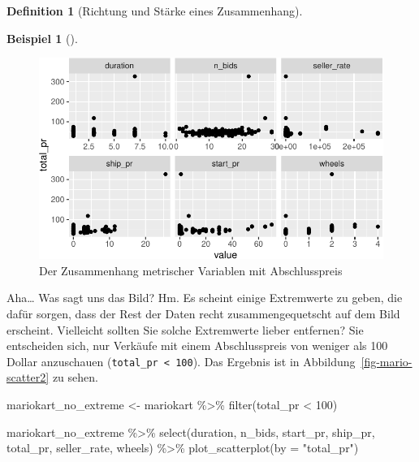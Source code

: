 \documentclass[
  a4paper,
  DIV=11]{scrreprt}
\newenvironment{Shaded}{\begin{snugshade}}{\end{snugshade}}
\newcommand{\AttributeTok}[1]{\textcolor[rgb]{0.40,0.45,0.13}{#1}}
\newcommand{\DecValTok}[1]{\textcolor[rgb]{0.68,0.00,0.00}{#1}}
\newcommand{\FunctionTok}[1]{\textcolor[rgb]{0.28,0.35,0.67}{#1}}
\newcommand{\NormalTok}[1]{\textcolor[rgb]{0.00,0.23,0.31}{#1}}
\newcommand{\OtherTok}[1]{\textcolor[rgb]{0.00,0.23,0.31}{#1}}
\newcommand{\SpecialCharTok}[1]{\textcolor[rgb]{0.37,0.37,0.37}{#1}}
\newcommand{\StringTok}[1]{\textcolor[rgb]{0.13,0.47,0.30}{#1}}
\theoremstyle{definition}
\theoremstyle{definition}
\newtheorem{example}{Beispiel}[chapter]
\theoremstyle{definition}
\newtheorem{definition}{Definition}[chapter]
\theoremstyle{remark}
\begin{document}
\begin{definition}[Richtung und Stärke eines
Zusammenhang]
\begin{example}[]
\begin{figure}[H]
{\includegraphics{040-verbildlichen_files/figure-pdf/fig-mario-scatter-1.pdf}

}

\caption{\label{fig-mario-scatter}Der Zusammenhang metrischer Variablen
mit Abschlusspreis}

\end{figure}%

Aha\ldots{} Was sagt uns das Bild? Hm. Es scheint einige Extremwerte zu
geben, die dafür sorgen, dass der Rest der Daten recht
zusammengequetscht auf dem Bild erscheint. Vielleicht sollten Sie solche
Extremwerte lieber entfernen? Sie entscheiden sich, nur Verkäufe mit
einem Abschlusspreis von weniger als 100 Dollar anzuschauen
(\texttt{total\_pr\ \textless{}\ 100}). Das Ergebnis ist in
Abbildung~\ref{fig-mario-scatter2} zu sehen.

\begin{Shaded}
\begin{Highlighting}[]
\NormalTok{mariokart\_no\_extreme }\OtherTok{\textless{}{-}}
\NormalTok{  mariokart }\SpecialCharTok{\%\textgreater{}\%} 
  \FunctionTok{filter}\NormalTok{(total\_pr }\SpecialCharTok{\textless{}} \DecValTok{100}\NormalTok{)}

\NormalTok{mariokart\_no\_extreme }\SpecialCharTok{\%\textgreater{}\%} 
  \FunctionTok{select}\NormalTok{(duration, n\_bids, start\_pr, }
\NormalTok{         ship\_pr, total\_pr, }
\NormalTok{         seller\_rate, wheels) }\SpecialCharTok{\%\textgreater{}\%} 
  \FunctionTok{plot\_scatterplot}\NormalTok{(}\AttributeTok{by =} \StringTok{"total\_pr"}\NormalTok{)}
\end{Highlighting}
\end{Shaded}

\begin{figure}[H]


\end{figure}
\end{example}
\end{definition}
\end{document}
